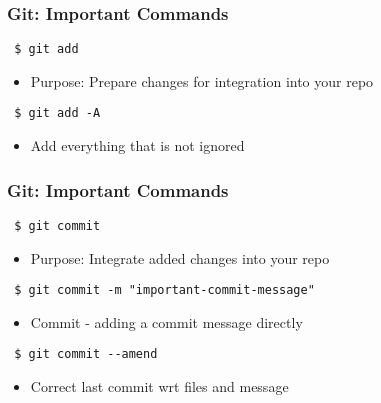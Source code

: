 \documentclass{beamer} %
\begin{document}
\begin{frame}[t, fragile]
\frametitle{Git: Important Commands}

\begin{verbatim} 
 $ git add
\end{verbatim}

\begin{itemize}
    \setlength\itemsep{1em}
	\item Purpose: Prepare changes for integration into your repo
\end{itemize}


\begin{verbatim} 
 $ git add -A
\end{verbatim}

\begin{itemize}
    \setlength\itemsep{1em}
	\item Add everything that is not ignored
\end{itemize}


\end{frame}

\begin{frame}[t, fragile]
\frametitle{Git: Important Commands}

\begin{verbatim} 
 $ git commit
\end{verbatim}

\begin{itemize}
	\setlength\itemsep{1em}
	\item Purpose: Integrate added changes into your repo
\end{itemize}

\begin{verbatim} 
 $ git commit -m "important-commit-message"
\end{verbatim}

\begin{itemize}
	\setlength\itemsep{1em}
	\item Commit - adding a commit message directly
\end{itemize}

\begin{verbatim} 
 $ git commit --amend
\end{verbatim}

\begin{itemize}
	\setlength\itemsep{1em}
	\item Correct last commit wrt files and message
\end{itemize}
\end{frame}
\end{document}
